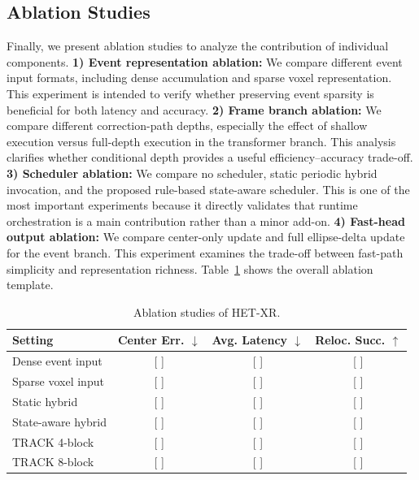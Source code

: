 \documentclass[journal]{IEEEtran}
\begin{document}
\subsection{Ablation Studies}
Finally, we present ablation studies to analyze the contribution of individual components.
%
\textbf{1) Event representation ablation:}
We compare different event input formats, including dense accumulation and sparse voxel representation. This experiment is intended to verify whether preserving event sparsity is beneficial for both latency and accuracy.
%
\textbf{2) Frame branch ablation:}
We compare different correction-path depths, especially the effect of shallow execution versus full-depth execution in the transformer branch. This analysis clarifies whether conditional depth provides a useful efficiency--accuracy trade-off.
%
\textbf{3) Scheduler ablation:}
We compare no scheduler, static periodic hybrid invocation, and the proposed rule-based state-aware scheduler. This is one of the most important experiments because it directly validates that runtime orchestration is a main contribution rather than a minor add-on.
%
\textbf{4) Fast-head output ablation:}
We compare center-only update and full ellipse-delta update for the event branch. This experiment examines the trade-off between fast-path simplicity and representation richness.
%
Table~\ref{tab:ablation} shows the overall ablation template.
%
\begin{table}[t]
\small
\centering
\caption{Ablation studies of HET-XR.}
\scriptsize
\label{tab:ablation}
\centering
\begin{tabular}{lccc}
\hline
Setting & Center Err. $\downarrow$ & Avg. Latency $\downarrow$ & Reloc. Succ. $\uparrow$ \\
\hline
Dense event input & [ ] & [ ] & [ ] \\
Sparse voxel input & [ ] & [ ] & [ ] \\
Static hybrid & [ ] & [ ] & [ ] \\
State-aware hybrid & [ ] & [ ] & [ ] \\
TRACK 4-block & [ ] & [ ] & [ ] \\
TRACK 8-block & [ ] & [ ] & [ ] \\
\hline
\end{tabular}
\end{table}
%
\end{document}
